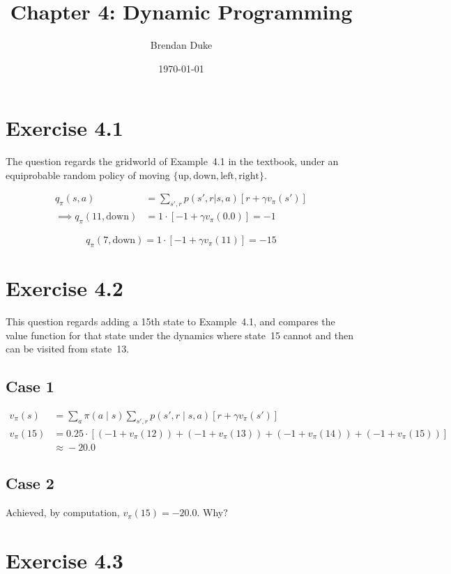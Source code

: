 \documentclass[a4paper, 12pt, titlepage]{article}
\date{\today}
\title{Chapter 4: Dynamic Programming}
\author{Brendan Duke}
\newcommand{\q}[2]{q_\pi(#1, #2)}
\renewcommand{\v}[1]{v_\pi(#1)}
\begin{document}
\section{Exercise 4.1}

The question regards the gridworld of Example~4.1 in the textbook, under an
equiprobable random policy of moving
$\{\textrm{up}, \textrm{down}, \textrm{left}, \textrm{right}\}$.

\begin{align*}
        \q{s}{a} &= \sum_{s', r} p(s', r | s, a) [r + \gamma \v{s'}]  \\
        \implies \q{11}{\textrm{down}} &= 1 \cdot [-1 + \gamma \v{0.0}] = -1
\end{align*}

\begin{equation*}
        \q{7}{\textrm{down}} = 1 \cdot [-1 + \gamma \v{11}] = -15
\end{equation*}


\section{Exercise 4.2}

This question regards adding a 15th state to Example~4.1, and compares the
value function for that state under the dynamics where state~15 cannot and then
can be visited from state~13.


\subsection{Case 1}

\begin{align*}
        \v{s} &= \sum_a \pi(a \mid s) \sum_{s', r} p(s', r \mid s, a) [r + \gamma \v{s'}] \\
        \v{15} &= 0.25 \cdot [(-1 + \v{12}) + (-1 + \v{13}) + (-1 + \v{14}) + (-1 + \v{15})] \\
        &\approx{} -20.0
\end{align*}


\subsection{Case 2}

Achieved, by computation, $\v{15} = -20.0$. Why?


\section{Exercise 4.3}
\end{document}
